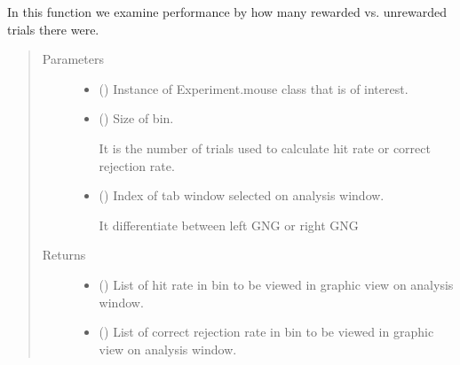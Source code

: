 \documentclass[letterpaper,10pt,english]{sphinxmanual}
\begin{document}
\begin{fulllineitems}
\label{\detokenize{NoSeMazeController/Analysis:Analysis.Analysis.weighted_binned_performance}}
\pysigstartsignatures
{}
\pysigstopsignatures
\sphinxAtStartPar
In this function we examine performance by how many rewarded vs.
unrewarded trials there were.
\begin{quote}\begin{description}
\item[{Parameters}] \leavevmode\begin{itemize}
\item {} 
\sphinxAtStartPar
{} () \textendash{} Instance of Experiment.mouse class that is of interest.

\item {} 
\sphinxAtStartPar
{} () \textendash{} 
\sphinxAtStartPar
Size of bin.

\sphinxAtStartPar
It is the number of trials used to calculate hit rate or
correct rejection rate.


\item {} 
\sphinxAtStartPar
{} () \textendash{} 
\sphinxAtStartPar
Index of tab window selected on analysis window.

\sphinxAtStartPar
It differentiate between left GNG or right GNG


\end{itemize}

\item[{Returns}] \leavevmode
\sphinxAtStartPar
\begin{itemize}
\item {} 
\sphinxAtStartPar
{} () \textendash{} List of hit rate in bin to be viewed in graphic view on analysis
window.

\item {} 
\sphinxAtStartPar
{} () \textendash{} List of correct rejection rate in bin to be viewed in graphic view on
analysis window.

\end{itemize}


\end{description}\end{quote}

\end{fulllineitems}
\end{document}
